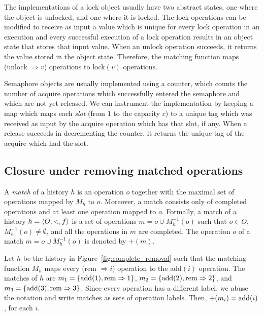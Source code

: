 \begin{example}[Locks]

  The implementations of a lock object usually have two abstract states, one
  where the object is unlocked, and one where it is locked. The lock operations
  can be modified to receive as input a value which is unique for every lock
  operation in an execution and every successful execution of a lock operation
  results in an object state that stores that input value. When an unlock
  operation succeeds, it returns the value stored in the object state.
  Therefore, the matching function maps (\textnormal{unlock} $\Rightarrow v$) operations to
  \textnormal{lock}$(v)$ operations.

\end{example}

\begin{example}[Semaphores]

  Semaphore objects are usually implemented using a counter, which counts the
  number of acquire operations which successfully entered the semaphore and
  which are not yet released. We can instrument the implementation by keeping a
  map which maps each \emph{slot} (from $1$ to the capacity $c$) to a unique
  tag which was received as input by the acquire operation which has that slot,
  if any. When a release succeeds in decrementing the counter, it returns the
  unique tag of the acquire which had the slot.

\end{example}

\subsection{Closure under removing matched operations}

A \emph{match} of a history $h$ is an operation $o$ together with the maximal 
set of operations mapped by $M_h$ to $o$. 
Moreover, a match consists only of 
completed operations and at least one operation mapped to $o$. Formally, a match of a 
history $h={\langle{O,<,f}\rangle}$ is a set of operations $m=o\cup M^{-1}_h(o)$ such 
that $o\in O$, $M^{-1}_h(o)\neq \emptyset$, and all the operations in $m$
are completed. The operation $o$ of a match $m=o\cup M^{-1}_h(o)$ 
is denoted by $+(m)$.

\begin{example}

  Let $h$ be the history in Figure~\ref{fig:complete_removal} such that the
  matching function $M_h$ maps every (\textnormal{rem} $\Rightarrow i$) operation to the
  \textnormal{add}$(i)$ operation. The matches of $h$ are $m_1 = {\{  \textnormal{add}(1),
  \textnormal{rem}\Rightarrow 1  \}}$, $m_2 = {\{  \textnormal{add}(2),
  \textnormal{rem}\Rightarrow 2  \}}$, and $m_3 = {\{  \textnormal{add}(3),
  \textnormal{rem}\Rightarrow 3  \}}$. Since every operation has a different label, we
  abuse the notation and write matches as sets of operation labels. Then,
  $+(m_i) = \textnormal{add}(i)$, for each $i$.

\end{example}

